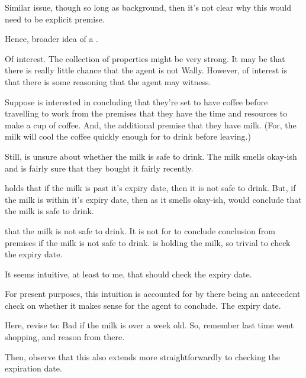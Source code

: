 \begin{note}
  Similar issue, though so long as background, then it's not clear why this would need to be explicit premise.

  Hence, broader idea of a \requ{}.
\end{note}

\begin{note}
  Of interest.
  The collection of properties might be very strong.
  It may be that there is really little chance that the agent is not Wally.
  However, of interest is that there is some reasoning that the agent may witness.
\end{note}

\begin{note}[Milk]
  \begin{illustration}
    Suppose  is interested in concluding that they're set to have coffee before travelling to work from the premises that they have the time and resources to make a cup of coffee.
    And, the additional premise that they have milk.
    (For, the milk will cool the coffee quickly enough for  to drink before leaving.)

    Still,  is unsure about whether the milk is safe to drink.
    The milk smells okay-ish and  is fairly sure that they bought it fairly recently.

     holds that if the milk is past it's expiry date, then it is not safe to drink.
    But, if the milk is within it's expiry date, then as it smells okay-ish,  would conclude that the milk is safe to drink.
  \end{illustration}
  \epVAd{} that the milk is not safe to drink.
  It is not \epVAd{} for  to conclude conclusion from premises if the milk is not safe to drink.
   is holding the milk, so trivial to check the expiry date.

  It seems intuitive, at least to me, that  should check the expiry date.

  For present purposes, this intuition is accounted for by there being an antecedent check on whether it makes sense for the agent to conclude.
  The expiry date.

  {
    \color{red}
    Here, revise to:
    Bad if the milk is over a week old.
    So, remember last time went shopping, and reason from there.

    Then, observe that this also extends more straightforwardly to checking the expiration date.
  }
\end{note}


